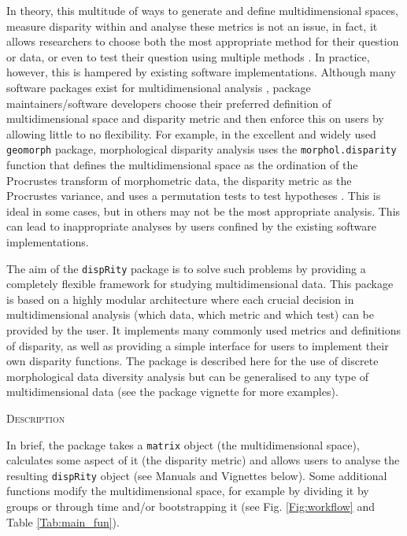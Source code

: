 \documentclass[12pt,letterpaper]{article}
\renewcommand{\section}[1]{%
\bigskip
\begin{center}
\begin{Large}
\normalfont\scshape #1
\medskip
\end{Large}
\end{center}}
\newcommand{\disp}{\texttt{dispRity} }
\begin{document}
In theory, this multitude of ways to generate and define multidimensional spaces, measure disparity within and analyse these metrics is not an issue, in fact, it allows researchers to choose both the most appropriate method for their question or data, or even to test their question using multiple methods \citep[such as][for biogeography]{matzke2013biogeobears}.
In practice, however, this is hampered by existing software implementations.
Although many software packages exist for multidimensional analysis \citep[e.g.][]{bouxin2005ginkgo,de2007ginkgo,oksanen2007vegan,adams2013geomorph,Claddis,adams2017geometric}, package maintainers/software developers choose their preferred definition of multidimensional space and disparity metric and then enforce this on users by allowing little to no flexibility.
For example, in the excellent and widely used \texttt{geomorph} package, morphological disparity analysis uses the \texttt{morphol.disparity} function that defines the multidimensional space as the ordination of the Procrustes transform of morphometric data, the disparity metric as the Procrustes variance, and uses a permutation tests to test hypotheses \citep{zelditch2012geometric,adams2013geomorph,adams2017geometric}.
This is ideal in some cases, but in others may not be the most appropriate analysis.
This can lead to inappropriate analyses by users confined by the existing software implementations. %

The aim of the \disp package is to solve such problems by providing a completely flexible framework for studying multidimensional data.
This package is based on a highly modular architecture where each crucial decision in multidimensional analysis (which data, which metric and which test) can be provided by the user.
It implements many commonly used metrics and definitions of disparity, as well as providing a simple interface for users to implement their own disparity functions.
The package is described here for the use of discrete morphological data diversity analysis but can be generalised to any type of multidimensional data (see the package vignette for more examples).

\section{Description}
In brief, the package takes a \texttt{matrix} object (the multidimensional space), calculates some aspect of it (the disparity metric) and allows users to analyse the resulting \disp object (see Manuals and Vignettes below).
Some additional functions modify the multidimensional space, for example by dividing it by groups or through time and/or bootstrapping it (see Fig. \ref{Fig:workflow} and Table \ref{Tab:main_fun}).
\end{document}

